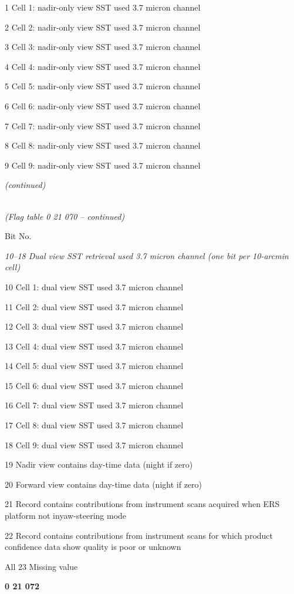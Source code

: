 1 Cell 1: nadir-only view SST used 3.7 micron channel

2 Cell 2: nadir-only view SST used 3.7 micron channel

3 Cell 3: nadir-only view SST used 3.7 micron channel

4 Cell 4: nadir-only view SST used 3.7 micron channel

5 Cell 5: nadir-only view SST used 3.7 micron channel

6 Cell 6: nadir-only view SST used 3.7 micron channel

7 Cell 7: nadir-only view SST used 3.7 micron channel

8 Cell 8: nadir-only view SST used 3.7 micron channel

9 Cell 9: nadir-only view SST used 3.7 micron channel

\emph{(continued)}

\emph{\\
(Flag table 0 21 070 -- continued)}

Bit No.

\emph{10--18 Dual view SST retrieval used 3.7 micron channel (one bit per 10-arcmin cell)}

10 Cell 1: dual view SST used 3.7 micron channel

11 Cell 2: dual view SST used 3.7 micron channel

12 Cell 3: dual view SST used 3.7 micron channel

13 Cell 4: dual view SST used 3.7 micron channel

14 Cell 5: dual view SST used 3.7 micron channel

15 Cell 6: dual view SST used 3.7 micron channel

16 Cell 7: dual view SST used 3.7 micron channel

17 Cell 8: dual view SST used 3.7 micron channel

18 Cell 9: dual view SST used 3.7 micron channel

19 Nadir view contains day-time data (night if zero)

20 Forward view contains day-time data (night if zero)

21 Record contains contributions from instrument scans acquired when ERS platform not inyaw-steering mode

22 Record contains contributions from instrument scans for which product confidence data show quality is poor or unknown

All 23 Missing value

\textbf{0 21 072}

